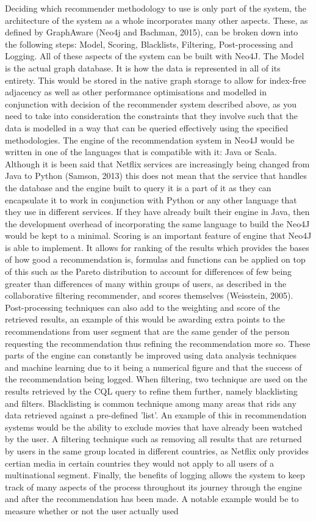 \documentclass[a4paper]{article}
\begin{document}
Deciding which recommender methodology to use is only part of the system, the architecture of the system as a whole incorporates many other aspects. These, as defined by GraphAware (Neo4j and Bachman, 2015), can be broken down into the following steps: Model, Scoring, Blacklists, Filtering, Post-processing and Logging. All of these aspects of the system can be built with Neo4J. The Model is the actual graph database. It is how the data is represented in all of its entirety. This would be stored in the native graph storage to allow for index-free adjacency as well as other performance optimisations and modelled in conjunction with decision of the recommender system described above, as you need to take into consideration the constraints that they involve such that the data is modelled in a way that can be queried effectively using the specified methodologies. The engine of the recommendation system in Neo4J would be written in one of the languages that is compatible with it: Java or Scala. Although it is been said that Netflix services are increasingly being changed from Java to Python (Samson, 2013) this does not mean that the service that handles the database and the engine built to query it is a part of it as they can encapsulate it to work in conjunction with Python or any other language that they use in different services. If they have already built their engine in Java, then the development overhead of incorporating the same language to build the Neo4J would be kept to a minimal. Scoring is an important feature of engine that Neo4J is able to implement. It allows for ranking of the results which provides the bases of how good a recommendation is, formulas and functions can be applied on top of this such as the Pareto distribution to account for differences of few being greater than differences of many within groups of users, as described in the collaborative filtering recommender, and scores themselves (Weisstein, 2005). Post-processing techniques can also add to the weighting and score of the retrieved results, an example of this would be awarding extra points to the recommendations from user segment that are the same gender of the person requesting the recommendation thus refining the recommendation more so. These parts of the engine can constantly be improved using data analysis techniques and machine learning due to it being a numerical figure and that the success of the recommendation being logged. When filtering, two technique are used on the results retrieved by the CQL query to refine them further, namely blacklisting and filters. Blacklisting is common technique among many areas that rids any data retrieved against a pre-defined 'list'. An example of this in recommendation systems would be the ability to exclude movies that have already been watched by the user. A filtering technique such as removing all results that are returned by users in the same group located in different countries, as Netflix only provides certian media in certain countries they would not apply to all users of a multinational segment. Finally, the benefits of logging allows the system to keep track of many aspects of the process throughout its journey through the engine and after the recommendation has been made. A notable example would be to measure whether or not the user actually used 
\end{document}
